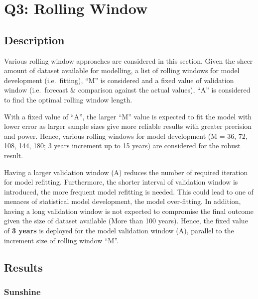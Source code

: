 \documentclass[
  11pt,
]{article}
\begin{document}
\newpage

\hypertarget{q3-rolling-window}{%
\section{Q3: Rolling Window}\label{q3-rolling-window}}

\hypertarget{description}{%
\subsection{Description}\label{description}}

Various rolling window approaches are considered in this section. Given
the sheer amount of dataset available for modelling, a list of rolling
windows for model development (i.e.~fitting), ``M'' is considered and a
fixed value of validation window (i.e.~forecast \& comparison against
the actual values), ``A'' is considered to find the optimal rolling
window length.

With a fixed value of ``A'', the larger ``M'' value is expected to fit
the model with lower error as larger sample sizes give more reliable
results with greater precision and power. Hence, various rolling windows
for model development (M = 36, 72, 108, 144, 180; 3 years increment up
to 15 years) are considered for the robust result.

Having a larger validation window (A) reduces the number of required
iteration for model refitting. Furthermore, the shorter interval of
validation window is introduced, the more frequent model refitting is
needed. This could lead to one of menaces of statistical model
development, the model over-fitting. In addition, having a long
validation window is not expected to compromise the final outcome given
the size of dataset available (More than 100 years). Hence, the fixed
value of \textbf{3 years} is deployed for the model validation window
(A), parallel to the increment size of rolling window ``M''.

\hypertarget{results}{%
\subsection{Results}\label{results}}

\hypertarget{sunshine}{%
\subsubsection{Sunshine}\label{sunshine}}
\end{document}
